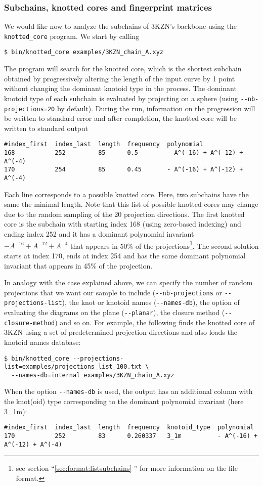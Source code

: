 \subsubsection{Subchains, knotted cores and fingerprint matrices}
We would like now to analyze the subchains of 3KZN's backbone using the \lstinline{knotted_core} program. We start by calling
\begin{lstlisting}
$ bin/knotted_core examples/3KZN_chain_A.xyz 
\end{lstlisting}
The program will search for the knotted core, which is the shortest subchain obtained by progressively altering the length of the input curve by 1 point without changing the dominant knotoid type in the process. The dominant knotoid type of each subchain is evaluated by projecting on a sphere (using \lstinline{--nb-projections=20} by default). During the run, information on the progression will be written to standard error and after completion, the knotted core will be written to standard output
\begin{lstlisting}
#index_first  index_last  length  frequency  polynomial
168           252         85      0.5        - A^(-16) + A^(-12) + A^(-4)
170           254         85      0.45       - A^(-16) + A^(-12) + A^(-4)
\end{lstlisting}
Each line corresponds to a possible knotted core. Here, two subchains have the same the minimal length. Note that this list of possible knotted cores may change due to the random sampling of the 20 projection directions. The first knotted core is the subchain with starting index 168 (using zero-based indexing) and ending index 252 and it has a dominant polynomial invariant $-A^{-16}+A^{-12}+A^{-4}$ that appears in 50\% of the projections\footnote{see section ``\ref{sec:format:listsubchains} '' for more information on the file format.}. The second solution starts at index 170, ends at index 254 and has the same dominant polynomial invariant that appears in 45\% of the projection.

In analogy with the case explained above, we can specify the number of random projections that we want our sample to include (\lstinline{--nb-projections} or \lstinline{--projections-list}), the knot or knotoid names (\lstinline{--names-db}), the option of evaluating the diagrams on the plane (\lstinline{--planar}), the closure method (\lstinline{--closure-method}) and so on. For example, the following finds the knotted core of 3KZN using a set of predetermined projection directions and also loads the knotoid names database:
\begin{lstlisting}
$ bin/knotted_core --projections-list=examples/projections_list_100.txt \
  --names-db=internal examples/3KZN_chain_A.xyz
\end{lstlisting}
When the option \lstinline{--names-db} is used, the output has an additional column with the knot(oid) type corresponding to the dominant polynomial invariant (here 3\_1m):
\begin{lstlisting}
#index_first  index_last  length  frequency  knotoid_type  polynomial
170           252         83      0.260337   3_1m          - A^(-16) + A^(-12) + A^(-4)
\end{lstlisting}



